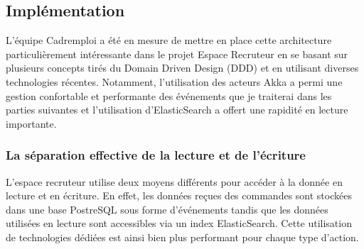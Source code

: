\subsection{Implémentation}
\label{sub:Implémentation}
L'équipe Cadremploi a été en mesure de mettre en place cette architecture particulièrement intéressante dans le projet Espace Recruteur en se basant sur plusieurs concepts tirés du Domain Driven Design (DDD) et en utilisant diverses technologies récentes.
Notamment, l'utilisation des acteurs Akka a permi une gestion confortable et performante des événements que je traiterai dans les parties suivantes et l'utilisation d'ElasticSearch a offert une rapidité en lecture importante.

\subsubsection{La séparation effective de la lecture et de l'écriture}
\label{subs:La séparation effective de la lecture et de l'écriture}
L'espace recruteur utilise deux moyens différents pour accéder à la donnée en lecture et en écriture.
En effet, les données reçues des commandes sont stockées dans une base PostreSQL sous forme d'événements tandis que les données utilisées en lecture sont accessibles via un index ElasticSearch.
Cette utilisation de technologies dédiées est ainsi bien plus performant pour chaque type d'action.
